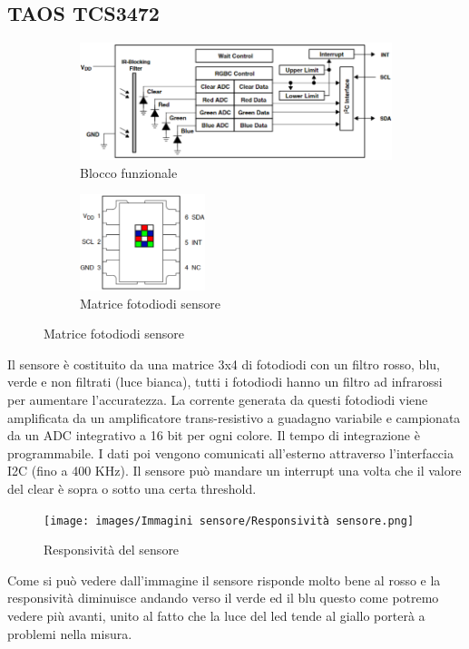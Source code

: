 \documentclass[a4paper,12pt]{report}
\begin{document}
\subsection{TAOS TCS3472}
\begin{figure}[h]
    \begin{subfigure}{0.5\textwidth}
    \includegraphics[width=0.8\linewidth]{images/Immagini sensore/Blocco funzionale.png}
    \caption{Blocco funzionale}
    \end{subfigure}
    \begin{subfigure}{0.4\textwidth}
    \includegraphics[width=0.4\textwidth]{images/Immagini sensore/sensore.png}
    \caption{Matrice fotodiodi sensore}
    \end{subfigure}
\end{figure}
Il sensore è costituito da una matrice 3x4 di fotodiodi con un filtro rosso, blu, verde e non filtrati (luce bianca), tutti i fotodiodi hanno un filtro ad infrarossi per aumentare l'accuratezza. La corrente generata da questi fotodiodi viene amplificata da un amplificatore trans-resistivo a guadagno variabile e campionata da un ADC integrativo a 16 bit per ogni colore. Il tempo di integrazione è programmabile. I dati poi vengono comunicati all'esterno attraverso l'interfaccia I2C (fino a 400 KHz). Il sensore può mandare un interrupt una volta che il valore del clear è sopra o sotto una certa threshold.
\begin{figure}[h]
    \centering
    \texttt{[image: images/Immagini sensore/Responsività sensore.png]}
    \caption{Responsività del sensore}
\end{figure}
Come si può vedere dall'immagine il sensore risponde molto bene al rosso e la responsività diminuisce andando verso il verde ed il blu questo come potremo vedere più avanti, unito al fatto che la luce del led tende al giallo porterà a problemi nella misura.
\end{document}
